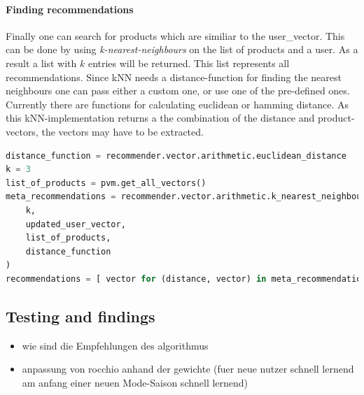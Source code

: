 \paragraph{Finding recommendations}
Finally one can search for products which are similiar to the user\_vector.
This can be done by using \textit{k-nearest-neighbours} on the list of products and a user.
As a result a list with $k$ entries will be returned.
This list represents all recommendations.
Since kNN needs a distance-function for finding the nearest neighbours one can pass either a custom one, or use one of the pre-defined ones.
Currently there are functions for calculating euclidean or hamming distance.
As this kNN-implementation returns a the combination of the distance and product-vectors, the vectors may have to be extracted.
\begin{lstlisting}[language=Python,caption={Retrieving recommendations},label={lst:recommenderlib-knn}]
distance_function = recommender.vector.arithmetic.euclidean_distance
k = 3
list_of_products = pvm.get_all_vectors()
meta_recommendations = recommender.vector.arithmetic.k_nearest_neighbours(
    k,
    updated_user_vector,
    list_of_products,
    distance_function
)
recommendations = [ vector for (distance, vector) in meta_recommendations ]
\end{lstlisting}



\FloatBarrier

\subsection{Testing and findings}
\label{sec:testing-findings}
{\color{red}
    \begin{itemize}
        \item wie sind die Empfehlungen des algorithmus
        \item anpassung von rocchio anhand der gewichte (fuer neue nutzer schnell lernend am anfang einer neuen Mode-Saison schnell lernend)
    \end{itemize}
}

